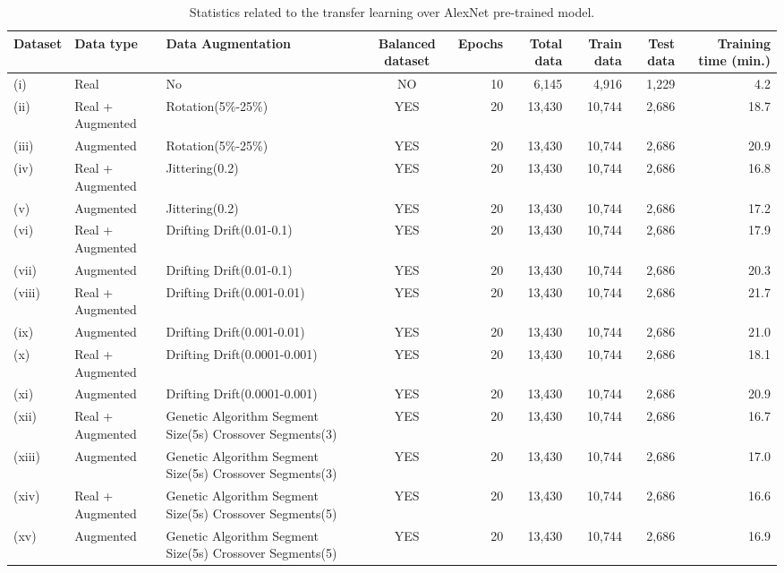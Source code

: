 \documentclass[journal]{IEEEtran}
\begin{document}
\begin{table}
\caption{Statistics related to the transfer learning over AlexNet pre-trained model.}
\centering
\begin{adjustbox}{width=\textwidth}
\begin{tabular}{lllcrrrrr}
\hline\hline %
Dataset & Data type & Data Augmentation & Balanced dataset & Epochs & Total data & Train data & Test data & Training time (min.) \\
\hline %
(i) & Real & No & NO & 10 & 6,145 & 4,916 & 1,229 & 4.2 \\
(ii) & Real + Augmented & Rotation(5\%-25\%) & YES & 20 & 13,430 & 10,744 & 2,686 & 18.7 \\
(iii) & Augmented & Rotation(5\%-25\%) & YES & 20 & 13,430 & 10,744 & 2,686 & 20.9 \\
(iv) & Real + Augmented & Jittering(0.2) & YES & 20 & 13,430 & 10,744 & 2,686 & 16.8 \\
(v) & Augmented & Jittering(0.2) & YES & 20 & 13,430 & 10,744 & 2,686 & 17.2 \\
(vi) & Real + Augmented & Drifting Drift(0.01-0.1) & YES & 20 & 13,430 & 10,744 & 2,686 & 17.9 \\
(vii) & Augmented & Drifting
  Drift(0.01-0.1) & YES & 20 & 13,430 & 10,744 & 2,686 & 20.3 \\
(viii) & Real + Augmented & Drifting Drift(0.001-0.01) & YES & 20 & 13,430 & 10,744 & 2,686 & 21.7 \\
(ix) & Augmented & Drifting
  Drift(0.001-0.01) & YES & 20 & 13,430 & 10,744 & 2,686 & 21.0 \\
(x) & Real + Augmented & Drifting Drift(0.0001-0.001) & YES & 20 & 13,430 & 10,744 & 2,686 & 18.1 \\
(xi) & Augmented & Drifting Drift(0.0001-0.001) & YES & 20 & 13,430 & 10,744 & 2,686 & 20.9 \\
(xii) & Real + Augmented & Genetic Algorithm
  Segment Size(5s) Crossover Segments(3) & YES & 20 & 13,430 & 10,744 & 2,686 & 16.7 \\
(xiii) & Augmented & Genetic Algorithm Segment Size(5s) Crossover
  Segments(3) & YES & 20 & 13,430 & 10,744 & 2,686 & 17.0 \\
(xiv) & Real + Augmented & Genetic Algorithm
  Segment Size(5s) Crossover Segments(5) & YES & 20 & 13,430 & 10,744 & 2,686 & 16.6 \\
(xv) & Augmented & Genetic Algorithm Segment Size(5s) Crossover
  Segments(5) & YES & 20 & 13,430 & 10,744 & 2,686 & 16.9 \\

\end{tabular}
\end{adjustbox}
\end{table}
\end{document}
